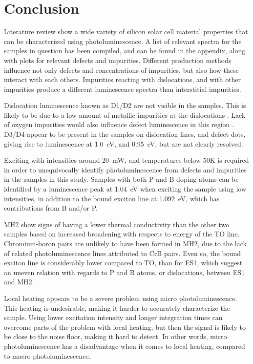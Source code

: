 \section{Conclusion}

Literature review show a wide variety of silicon solar cell material properties that can be characterized using photoluminescence. A list of relevant spectra for the samples in question has been compiled, and can be found in the appendix, along with plots for relevant defects and impurities. Different production methods influence not only defects and concentrations of impurities, but also how these interact with each others. Impurities reacting with dislocations, and with other impurities produce a different luminescence spectra than interstitial impurities.

Dislocation luminescence known as D1/D2 are not visible in the samples. This is likely to be due to a low amount of metallic impurities at the dislocations \cite{arguirov07}. Lack of oxygen impurities would also influence defect luminescence in this region \cite{inoue07}. D3/D4 appear to be present in the samples on dislocation lines, and defect dots, giving rise to luminescence at 1.0~eV, and 0.95~eV, but are not clearly resolved.

Exciting with intensities around 20~mW, and temperatures below 50K is required in order to unequivocally identify photoluminescence from defects and impurities in the samples in this study. Samples with both P and B doping atoms can be identified by a luminescence peak at 1.04~eV when exciting the sample using low intensities, in addition to the bound exciton line at 1.092~eV, which has contributions from B and/or P. 

MH2 show signs of having a lower thermal conductivity than the other two samples based on increased broadening with respects to energy of the TO line. Chromium-boron pairs are unlikely to have been formed in MH2, due to the lack of related photoluminescence lines attributed to CrB pairs. Even so, the bound exciton line is considerably lower compared to TO, than for ES1, which suggest an uneven relation with regards to P and B atoms, or dislocations, between ES1 and MH2.

Local heating appears to be a severe problem using micro photoluminescence. This heating is undesirable, making it harder to accurately characterize the sample. Using lower excitation intensity and longer integration times can overcome parts of the problem with local heating, but then the signal is likely to be close to the noise floor, making it hard to detect. In other words, micro photoluminescence has a disadvantage when it comes to local heating, compared to macro photoluminescence.
